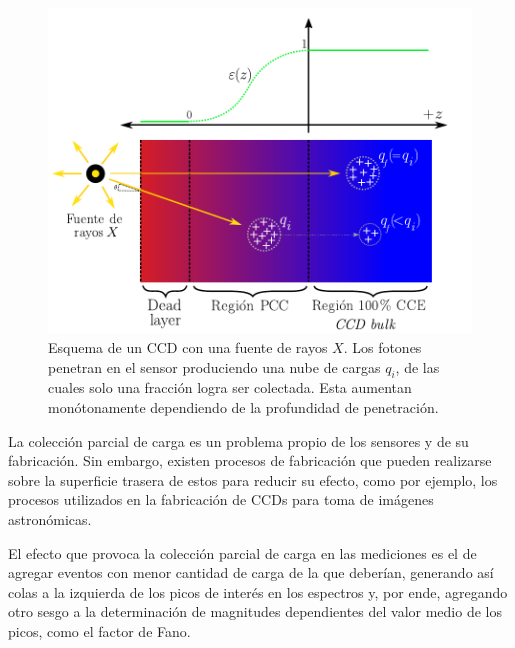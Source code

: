\begin{figure}%
    \centering
        \includegraphics[scale=.8]{Figs/PCC.pdf}
    \caption{\footnotesize{Esquema de un CCD con una fuente de rayos $X$. Los fotones penetran en el sensor produciendo una nube de cargas $q_{i}$, de las cuales solo una fracción logra ser colectada. Esta aumentan monótonamente dependiendo de la profundidad de penetración.}}
    \label{fig:PCC}
\end{figure}
La colección parcial de carga es un problema propio de los sensores y de su fabricación. Sin embargo, existen procesos de fabricación que pueden realizarse sobre la superficie trasera de estos para reducir su efecto, como por ejemplo, los procesos utilizados en la fabricación de CCDs para toma de imágenes astronómicas. %

El efecto que provoca la colección parcial de carga en las mediciones es el de agregar eventos con menor cantidad de carga de la que deberían, generando así colas a la izquierda de los picos de interés en los espectros y, por ende, agregando otro sesgo a la determinación de magnitudes dependientes del valor medio de los picos, como el factor de Fano.


